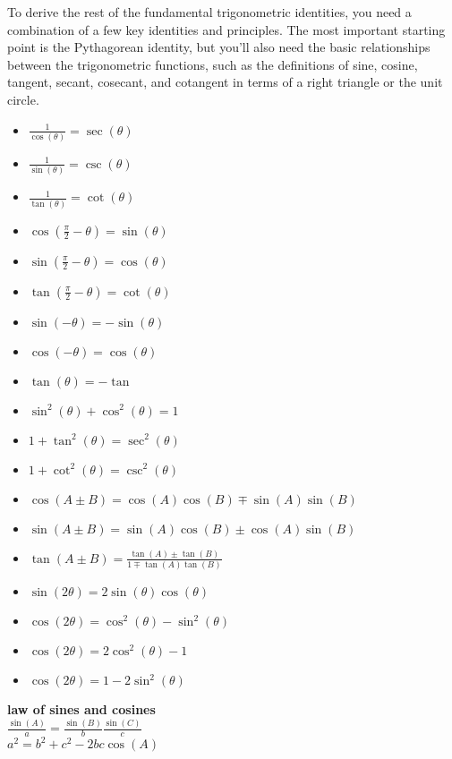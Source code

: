\documentclass{article}
\begin{document}
To derive the rest of the fundamental trigonometric identities, you need a combination of a few key identities and principles. The most important starting point is the Pythagorean identity, but you’ll also need the basic relationships between the trigonometric functions, such as the definitions of sine, cosine, tangent, secant, cosecant, and cotangent in terms of a right triangle or the unit circle.
	\begin{itemize}
		\item $\frac{1}{\cos(\theta)} = \sec(\theta)$	
		\item $\frac{1}{\sin(\theta)} = \csc(\theta) $
		\item $\frac{1}{\tan(\theta)} = \cot(\theta)$
		\item $\cos(\frac{\pi}{2} - \theta) = \sin(\theta)$
		\item $\sin(\frac{\pi}{2} - \theta) = \cos(\theta)$
		\item $\tan(\frac{\pi}{2} - \theta) = \cot(\theta)$
		\item $\sin(-\theta) = -\sin(\theta)$
		\item $\cos(-\theta) = \cos(\theta)$
		\item $\tan(\theta) = -\tan$
		\item $\sin^2(\theta) + \cos^2(\theta) = 1$
		\item $1 + \tan^2(\theta) = \sec^2(\theta)$
		\item $1 + \cot^2(\theta) = \csc^2(\theta)$
		\item $\cos(A \pm B) = \cos(A)\cos(B) \mp \sin(A)\sin(B)$		
		\item $\sin(A \pm B) = \sin(A)\cos(B) \pm \cos(A)\sin(B)$
		\item $\tan(A \pm B) = \frac{\tan(A) \pm \tan(B)}{1 \mp \tan(A)\tan(B)}$
		\item $\sin(2\theta) = 2\sin(\theta)\cos(\theta)$
		\item $\cos(2\theta) = \cos^2(\theta) - \sin^2(\theta)$		
		\item $\cos(2\theta) = 2\cos^2(\theta) - 1$
		\item $\cos(2\theta) = 1 - 2\sin^2(\theta)$
	\end{itemize}



\textbf{law of sines and cosines}\\

	$\frac{\sin(A)}{a} = \frac{\sin(B)}{b} \frac{\sin(C)}{c}$\\
	$a^2 = b^2 + c^2 - 2bc\cos(A)$\\
\end{document}
